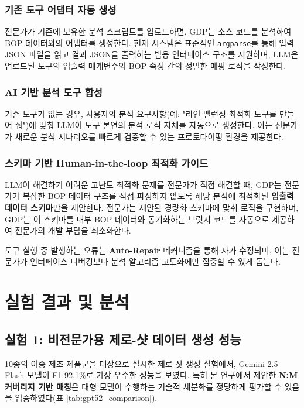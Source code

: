 \documentclass[conference]{IEEEtran}
\begin{document}
\subsubsection{기존 도구 어댑터 자동 생성}
전문가가 기존에 보유한 분석 스크립트를 업로드하면, GDP는 소스 코드를 분석하여 BOP 데이터와의 어댑터를 생성한다. 현재 시스템은 표준적인 \texttt{argparse}를 통해 입력 JSON 파일을 읽고 결과 JSON을 출력하는 범용 인터페이스 구조를 지원하며, LLM은 업로드된 도구의 입출력 매개변수와 BOP 속성 간의 정밀한 매핑 로직을 작성한다.

\subsubsection{AI 기반 분석 도구 합성}
기존 도구가 없는 경우, 사용자의 분석 요구사항(예: "라인 밸런싱 최적화 도구를 만들어 줘")에 맞춰 LLM이 도구 본연의 분석 로직 자체를 자동으로 생성한다. 이는 전문가가 새로운 분석 시나리오를 빠르게 검증할 수 있는 프로토타이핑 환경을 제공한다.

\subsubsection{스키마 기반 Human-in-the-loop 최적화 가이드}
LLM이 해결하기 어려운 고난도 최적화 문제를 전문가가 직접 해결할 때, GDP는 전문가가 복잡한 BOP 데이터 구조를 직접 파싱하지 않도록 해당 분석에 최적화된 \textbf{입출력 데이터 스키마}만을 제안한다. 전문가는 제안된 경량화 스키마에 맞춰 로직을 구현하며, GDP는 이 스키마를 내부 BOP 데이터와 동기화하는 브릿지 코드를 자동으로 제공하여 전문가의 개발 부담을 최소화한다.

도구 실행 중 발생하는 오류는 \textbf{Auto-Repair} 메커니즘을 통해 자가 수정되며, 이는 전문가가 인터페이스 디버깅보다 분석 알고리즘 고도화에만 집중할 수 있게 돕는다.

\section{실험 결과 및 분석}

\subsection{실험 1: 비전문가용 제로-샷 데이터 생성 성능}
10종의 이종 제조 제품군을 대상으로 실시한 제로-샷 생성 실험에서, Gemini 2.5 Flash 모델이 F1 92.1\%로 가장 우수한 성능을 보였다. 특히 본 연구에서 제안한 \textbf{N:M 커버리지 기반 매칭}은 대형 모델이 수행하는 기술적 세분화를 정당하게 평가할 수 있음을 입증하였다(표 \ref{tab:gpt52_comparison}).
\end{document}
